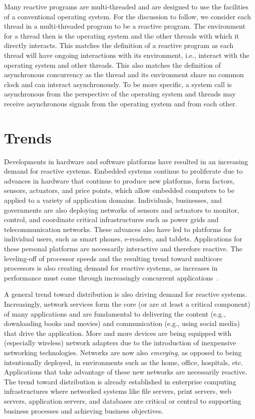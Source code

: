 Many reactive programs are multi-threaded and are designed to use the facilities of a conventional operating system.
For the discussion to follow, we consider each thread in a multi-threaded program to be a reactive program.
The environment for a thread then is the operating system and the other threads with which it directly interacts.
This matches the definition of a reactive program as each thread will have ongoing interactions with its environment, i.e., interact with the operating system and other threads.
This also matches the definition of asynchronous concurrency as the thread and its environment share no common clock and can interact asynchronously.
To be more specific, a system call is asynchronous from the perspective of the operating system and threads may receive asynchronous signals from the operating system and from each other.

\section{Trends}

Developments in hardware and software platforms have resulted in an increasing demand for reactive systems.
Embedded systems continue to proliferate due to advances in hardware that continue to produce new platforms, form factors, sensors, actuators, and price points, which allow embedded computers to be applied to a variety of application domains.
Individuals, businesses, and governments are also deploying networks of sensors and actuators to monitor, control, and coordinate critical infrastructures such as power grids and telecommunication networks.
These advances also have led to platforms for individual users, such as smart phones, e-readers, and tablets.
Applications for these personal platforms are necessarily interactive and therefore reactive.
The leveling-off of processor speeds and the resulting trend toward multicore processors is also creating demand for reactive systems, as increases in performance must come through increasingly concurrent applications~\cite{sutter2005software}.

A general trend toward distribution is also driving demand for reactive systems.
Increasingly, network services form the core (or are at least a critical component) of many applications and are fundamental to delivering the content (e.g., downloading books and movies) and communication (e.g., using social media) that drive the application.
More and more devices are being equipped with (especially wireless) network adapters due to the introduction of inexpensive networking technologies.
Networks are now also \emph{emerging}, as opposed to being intentionally deployed, in environments such as the home, office, hospitals, etc.
Applications that take advantage of these new networks are necessarily reactive.
The trend toward distribution is already established in enterprise computing infrastructures where networked systems like file servers, print servers, web servers, application servers, and databases are critical or central to supporting business processes and achieving business objectives.

